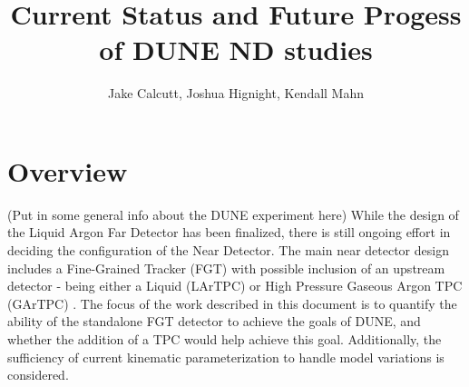 \documentclass[12pt]{article}
\title{Current Status and Future Progess of DUNE ND studies}
\date{}
\begin{document}
\author[1]{Jake Calcutt, Joshua Hignight, Kendall Mahn}


\maketitle
\thispagestyle{fancy}

\section{Overview}\label{sec:view}


(Put in some general info about the DUNE experiment here) While the design of the Liquid Argon Far Detector has been finalized, there is still ongoing effort in deciding the configuration of the Near Detector. The main near detector design includes a Fine-Grained Tracker (FGT) with possible inclusion of an upstream detector - being either a Liquid (LArTPC) or High Pressure Gaseous Argon TPC (GArTPC) .  The focus of the work described in this document is to quantify the ability of the standalone FGT detector to achieve the goals of DUNE, and whether the addition of a TPC would help achieve this goal. Additionally, the sufficiency of current kinematic parameterization to handle model variations is considered.
\end{document}
